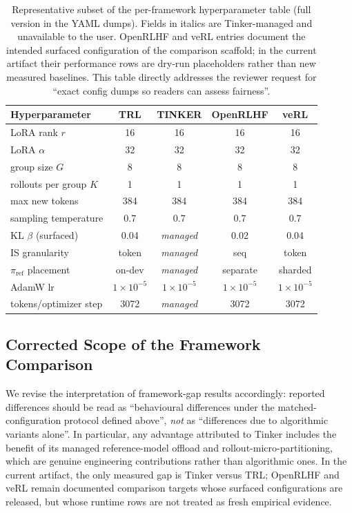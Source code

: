 \begin{table}[ht]
\centering
\small
\begin{tabular}{lcccc}
\toprule
Hyperparameter & TRL & TINKER & OpenRLHF & veRL \\
\midrule
LoRA rank $r$                  & 16   & 16   & 16   & 16   \\
LoRA $\alpha$                  & 32   & 32   & 32   & 32   \\
group size $G$                 & 8    & 8    & 8    & 8    \\
rollouts per group $K$         & 1    & 1    & 1    & 1    \\
max new tokens                 & 384  & 384  & 384  & 384  \\
sampling temperature           & 0.7  & 0.7  & 0.7  & 0.7  \\
KL $\beta$ (surfaced)          & 0.04 & \emph{managed} & 0.02 & 0.04 \\
IS granularity                 & token & \emph{managed} & seq  & token \\
$\pi_\text{ref}$ placement      & on-dev & \emph{managed} & separate & sharded \\
AdamW lr                       & $1\!\times\!10^{-5}$ & $1\!\times\!10^{-5}$ & $1\!\times\!10^{-5}$ & $1\!\times\!10^{-5}$ \\
tokens/optimizer step          & 3072 & \emph{managed} & 3072 & 3072 \\
\bottomrule
\end{tabular}
\caption{Representative subset of the per-framework hyperparameter table
(full version in the YAML dumps). Fields in italics are Tinker-managed
and unavailable to the user. OpenRLHF and veRL entries document the
intended surfaced configuration of the comparison scaffold; in the current
artifact their performance rows are dry-run placeholders rather than new
measured baselines. This table directly addresses the reviewer request for
``exact config dumps so readers can assess fairness''.}
\label{tab:framework-configs}
\end{table}

\subsection{Corrected Scope of the Framework Comparison}

We revise the interpretation of framework-gap results accordingly:
reported differences should be read as ``behavioural differences under
the matched-configuration protocol defined above'', \emph{not} as
``differences due to algorithmic variants alone''. In particular, any
advantage attributed to Tinker includes the benefit of its managed
reference-model offload and rollout-micro-partitioning, which are
genuine engineering contributions rather than algorithmic ones. In the
current artifact, the only measured gap is Tinker versus TRL; OpenRLHF and
veRL remain documented comparison targets whose surfaced configurations are
released, but whose runtime rows are not treated as fresh empirical evidence.
